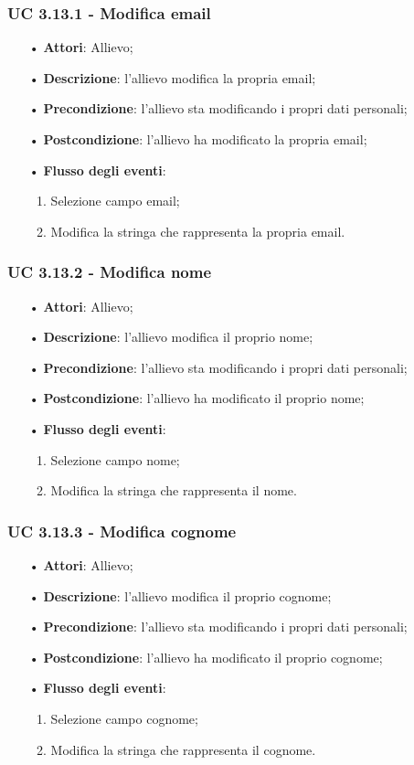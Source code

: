 \subsubsection{UC 3.13.1 - Modifica email}
\begin{itemize}
	\item[•]\textbf{Attori}: Allievo;
	\item[•]\textbf{Descrizione}: l'allievo modifica la propria email;
	\item[•]\textbf{Precondizione}: l'allievo sta modificando i propri dati personali;
	\item[•]\textbf{Postcondizione}: l'allievo ha modificato la propria email; 
	\item[•]\textbf{Flusso degli eventi}: 
	\begin{enumerate}
		\item Selezione campo email;
		\item Modifica la stringa che rappresenta la propria email.
	\end{enumerate}
\end{itemize}
\subsubsection{UC 3.13.2 - Modifica nome}
\begin{itemize}
	\item[•]\textbf{Attori}: Allievo;
	\item[•]\textbf{Descrizione}: l'allievo modifica il proprio nome;
	\item[•]\textbf{Precondizione}: l'allievo sta modificando i propri dati personali;
	\item[•]\textbf{Postcondizione}: l'allievo ha modificato il proprio nome; 
	\item[•]\textbf{Flusso degli eventi}: 
	\begin{enumerate}
		\item Selezione campo nome;
		\item Modifica la stringa che rappresenta il nome.
	\end{enumerate}
\end{itemize}
\subsubsection{UC 3.13.3 - Modifica cognome}
\begin{itemize}
	\item[•]\textbf{Attori}: Allievo;
	\item[•]\textbf{Descrizione}: l'allievo modifica il proprio cognome;
	\item[•]\textbf{Precondizione}: l'allievo sta modificando i propri dati personali;
	\item[•]\textbf{Postcondizione}: l'allievo ha modificato il proprio cognome; 
	\item[•]\textbf{Flusso degli eventi}: 
	\begin{enumerate}
		\item Selezione campo cognome;
		\item Modifica la stringa che rappresenta il cognome.
	\end{enumerate}
\end{itemize}

